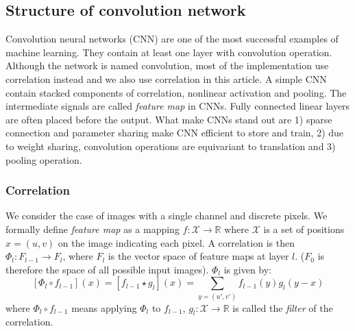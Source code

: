 \documentclass{IEEEtran}
\begin{document}
\subsection{Structure of convolution network}
Convolution neural networks (CNN) are one of the most successful examples of machine learning. 
They contain at least one layer with convolution operation. 
Although the network is named convolution, most of the implementation use correlation instead and 
we also use correlation in this article. 
A simple CNN contain stacked components of correlation, nonlinear activation and pooling. 
The intermediate signals are called \emph{feature map} in CNNs. 
Fully connected linear layers are often placed before the output.
What make CNNs stand out are\cite{goodfellow_deep_2016}
1) sparse connection and parameter sharing make CNN efficient to store and train,
2) due to weight sharing, convolution operations are equivariant to translation and 
3) pooling operation.

\subsubsection*{Correlation}
We consider the case of images with a single channel and discrete pixels. 
We formally define \emph{feature map} as a mapping $f\colon \mathcal{X}\to \mathbb{R}$ where $\mathcal{X}$ is a 
set of positions $x = (u,v)$ on the image indicating each pixel.
A correlation is then $\Phi_l\colon F_{l-1} \to F_{l}$, where $F_l$ is the vector space of feature maps at layer $l$. 
($F_0$ is therefore the space of all possible input images).
$\Phi_l$ is given by:
\begin{equation}
    \label{E:convolution}
    [\Phi_l \circ f_{l-1}](x) = [f_{l-1} \star g_l](x) = \sum_{y = (u',v')} f_{l-1}(y) g_l(y-x)
\end{equation}
where $\Phi_l \circ f_{l-1}$ means applying $\Phi_l$ to $f_{l-1}$, 
$g_l\colon \mathcal{X}\to \mathbb{R}$ is called the \emph{filter} of the correlation. 
\end{document}
